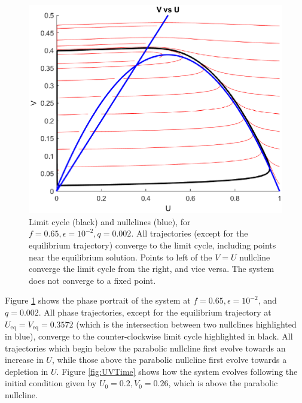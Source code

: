 \documentclass[twocolumn,amsmath,amssymb,aps]{revtex4}
\begin{document}
\begin{figure}[!htb]
	\includegraphics[scale=0.5]{limit_cycle_f_065_e_1e-2.eps}
	\caption{Limit cycle (black) and nullclines (blue), for $f = 0.65, \epsilon = 10^{-2}, q = 0.002$. All trajectories (except for the equilibrium trajectory) converge to the limit cycle, including points near the equilibrium solution. Points to left of the $V=U$ nullcline converge the limit cycle from the right, and vice versa. The system does not converge to  a fixed point.}
	\label{fig:LC}
\end{figure}

Figure \ref{fig:LC} shows the phase portrait of the system at $f = 0.65, \epsilon = 10^{-2}$, and $q = 0.002$. All phase trajectories, except for the equilibrium trajectory at $U_{\text{eq}} = V_{\text{eq}} = 0.3572$ (which is the intersection between two nullclines highlighted in blue), converge to the counter-clockwise limit cycle highlighted in black. All trajectories which begin below the parabolic nullcline first evolve towards an increase in $U$, while those above the parabolic nullcline first evolve towards a depletion in $U$. Figure \ref{fig:UVTime} shows how the system evolves following the initial condition given by $U_0 = 0.2, V_0 = 0.26$, which is above the parabolic nullcline. 
\end{document}
